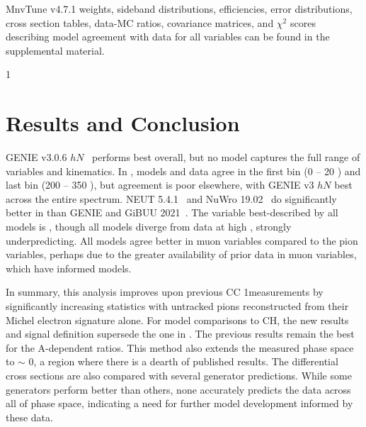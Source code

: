 \documentclass[aps,prl,twocolumn,showpacs,superscriptaddress,letterpaper,showkeys,superscriptaddress,floatfix,nofootinbib]{revtex4-1}
\newcommand{\showSections}[0]{0}
\newcommand{\supp}{the supplemental material}
\begin{document}
MnvTune v4.7.1 weights, sideband distributions, efficiencies, error distributions, cross section tables, data-MC ratios, covariance matrices, and $\chi^2$ scores describing model agreement with data for all variables can be found in \supp.

\if\showSections1 \section{Results and Conclusion} \fi

GENIE v3.0.6 $hN$~\cite{andreopoulos2015genieneutrinomontecarlo} performs best overall, but no model captures the full range of variables and kinematics. In \Tpi, models and data agree in the first bin (0 -- 20 \MeV) and last bin (200 -- 350 \MeV), but agreement is poor elsewhere, with GENIE v3 $hN$ best across the entire spectrum. NEUT 5.4.1~\cite{Hayato_2021} and NuWro  19.02~\cite{Golan:2012wx} do significantly better in \thpi than GENIE and GiBUU 2021~\cite{BUSS20121}. The variable best-described by all models is \Qsq, though all models diverge from data at high \Qsq, strongly underpredicting. All models agree better in muon variables compared to the pion variables, perhaps due to the greater availability of prior data in muon variables, which have informed models.  

In summary, this analysis improves upon previous \minerva CC 1\pip measurements by significantly increasing statistics with untracked pions reconstructed from their Michel electron signature alone. For model comparisons to CH, the new results and signal definition supersede the one in \cite{Bercellie.131.011801}. The previous results remain the best for the A-dependent ratios. This method also extends the measured phase space to \Tpi $\sim$ 0, a region where there is a dearth of published results. The differential cross sections are also compared with several generator predictions.  While some generators perform better than others, none accurately predicts the data across all of phase space, indicating a need for further model development informed by these data.
\end{document}
